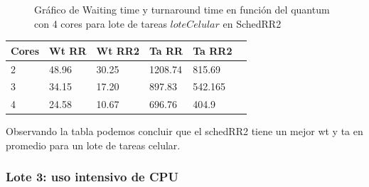 \begin{figure}[H]
\hfill
{}
\hfill
{}
\hfill
\caption{Gráfico de Waiting time y turnaround time en función del quantum con 4 cores para lote de tareas $loteCelular$ en SchedRR2}
\end{figure}

\begin{center}
    \begin{tabular}{ | l | l | l | l | l | p{5cm} |}
    \hline
    Cores & Wt RR & Wt RR2 & Ta RR & Ta RR2 \\ \hline
    2 & 48.96 & 30.25 & 1208.74 & 815.69 \\ \hline
    3 & 34.15 & 17.20 & 897.83 & 542.165 \\ \hline
    4 & 24.58 & 10.67 & 696.76 & 404.9 \\
	\hline
    \end{tabular}
\end{center}

Observando la tabla podemos concluir que el schedRR2 tiene un mejor wt y ta en promedio para un lote de tareas celular.

\subsubsection{Lote 3: uso intensivo de CPU}

